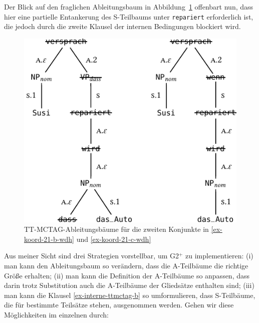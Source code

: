 Der Blick auf den fraglichen Ableitungsbaum in Abbildung~\ref{fig-deanchoring-11-2} offenbart nun, dass hier eine partielle Entankerung des S-Teilbaums unter {\tt repariert} erforderlich ist, die jedoch durch die zweite Klausel der internen Bedingungen blockiert wird. 
\begin{figure}[t]
\centering
\includegraphics{graphics/abb828.pdf}
\caption{\label{fig-deanchoring-11-2}TT-MCTAG-Ableitungsbäume für die zweiten Konjunkte in \ref{ex-koord-21-b-wdh} und \ref{ex-koord-21-c-wdh}}
\end{figure}
Aus meiner Sicht sind drei Strategien vorstellbar, um G2$^+$ zu implementieren: (i) man kann den Ableitungsbaum so verändern, dass die A-Teilbäume die richtige Grö\ss e erhalten; (ii) man kann die Definition der A-Teilbäume so anpassen, dass darin trotz Substitution auch die A-Teilbäume der Gliedsätze enthalten sind; (iii) man kann die Klausel \ref{ex-interne-ttmctag-b} so umformulieren, dass S-Teilbäume, die für bestimmte Teilsätze stehen, ausgenommen werden. Gehen wir diese Möglichkeiten im einzelnen durch:

